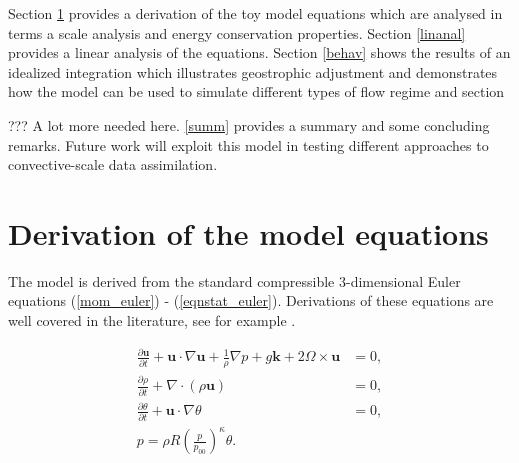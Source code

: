 \documentclass[times]{qjrms4}
\begin{document}
Section \ref{derivation} provides a derivation of the toy model equations which are analysed in 
terms a scale analysis and energy conservation properties. 
Section \ref{linanal} provides a linear analysis of the equations. Section \ref{behav} 
shows the results of an idealized integration which illustrates geostrophic adjustment
and demonstrates how the model can be used to simulate different types of flow regime and section 

??? A lot more needed here.
\ref{summ} provides a summary and some concluding remarks. Future work will exploit 
this model in testing different approaches to convective-scale data assimilation.

\section{Derivation of the model equations}\label{derivation}

The model is derived from the standard compressible 3-dimensional Euler equations 
(\ref{mom_euler}) - (\ref{eqnstat_euler}). Derivations of these equations 
are well covered in the literature, see for example \cite{holton, pielke, vallis}.

\begin{subequations} \label{euler_eqns}
\begin{align}
    \frac{\partial \mathbf u}{\partial t} + \mathbf u \cdot \nabla \mathbf u + 
    \frac{1}{\rho} \nabla p + g \mathbf k  + 2\Omega \times \mathbf u &=  0,  \label{mom_euler} \\
   \frac {\partial \rho}{\partial t}  +  \nabla \cdot  
   \left(\rho \mathbf u \right) &=  0 ,  \label{cont_euler}\\
   \frac{\partial \theta}{\partial t} +  \mathbf u  \cdot  
   \nabla \theta &= 0, \label{thermo_euler}\\
    p = \rho R \left( \frac {p}{p_{00}} \right)^{\kappa} \theta .  \label{eqnstat_euler}
\end{align}
\end{subequations}
\end{document}
